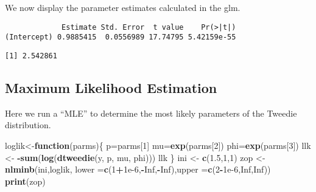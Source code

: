\documentclass[]{book}
\newenvironment{Shaded}{\begin{snugshade}}{\end{snugshade}}
\newcommand{\KeywordTok}[1]{\textcolor[rgb]{0.13,0.29,0.53}{\textbf{#1}}}
\newcommand{\DataTypeTok}[1]{\textcolor[rgb]{0.13,0.29,0.53}{#1}}
\newcommand{\DecValTok}[1]{\textcolor[rgb]{0.00,0.00,0.81}{#1}}
\newcommand{\FloatTok}[1]{\textcolor[rgb]{0.00,0.00,0.81}{#1}}
\newcommand{\StringTok}[1]{\textcolor[rgb]{0.31,0.60,0.02}{#1}}
\newcommand{\OtherTok}[1]{\textcolor[rgb]{0.56,0.35,0.01}{#1}}
\newcommand{\ControlFlowTok}[1]{\textcolor[rgb]{0.13,0.29,0.53}{\textbf{#1}}}
\newcommand{\OperatorTok}[1]{\textcolor[rgb]{0.81,0.36,0.00}{\textbf{#1}}}
\newcommand{\NormalTok}[1]{#1}
\theoremstyle{definition}
\theoremstyle{definition}
\theoremstyle{definition}
\theoremstyle{remark}
\begin{document}
We now display the parameter estimates calculated in the glm.

\begin{Shaded}
\end{Shaded}

\begin{verbatim}
             Estimate Std. Error  t value    Pr(>|t|)
(Intercept) 0.9885415  0.0556989 17.74795 5.42159e-55
\end{verbatim}

\begin{Shaded}
\end{Shaded}

\begin{verbatim}
[1] 2.542861
\end{verbatim}

\subsection{Maximum Likelihood
Estimation}\label{maximum-likelihood-estimation}

Here we run a ``MLE'' to determine the most likely parameters of the
Tweedie distribution.

\begin{Shaded}
\begin{Highlighting}[]
\NormalTok{loglik<-}\ControlFlowTok{function}\NormalTok{(parms)\{ }
\NormalTok{  p=parms[}\DecValTok{1}\NormalTok{]}
\NormalTok{  mu=}\KeywordTok{exp}\NormalTok{(parms[}\DecValTok{2}\NormalTok{])}
\NormalTok{  phi=}\KeywordTok{exp}\NormalTok{(parms[}\DecValTok{3}\NormalTok{])}
\NormalTok{  llk <-}\StringTok{ }\OperatorTok{-}\KeywordTok{sum}\NormalTok{(}\KeywordTok{log}\NormalTok{(}\KeywordTok{dtweedie}\NormalTok{(y, p, mu, phi)))}
\NormalTok{  llk}
\NormalTok{\}}
\NormalTok{ini <-}\StringTok{ }\KeywordTok{c}\NormalTok{(}\FloatTok{1.5}\NormalTok{,}\DecValTok{1}\NormalTok{,}\DecValTok{1}\NormalTok{)}
\NormalTok{zop <-}\StringTok{ }\KeywordTok{nlminb}\NormalTok{(ini,loglik, }\DataTypeTok{lower =}\KeywordTok{c}\NormalTok{(}\DecValTok{1}\OperatorTok{+}\FloatTok{1e-6}\NormalTok{,}\OperatorTok{-}\OtherTok{Inf}\NormalTok{,}\OperatorTok{-}\OtherTok{Inf}\NormalTok{),}\DataTypeTok{upper =}\KeywordTok{c}\NormalTok{(}\DecValTok{2}\OperatorTok{-}\FloatTok{1e-6}\NormalTok{,}\OtherTok{Inf}\NormalTok{,}\OtherTok{Inf}\NormalTok{))}
\KeywordTok{print}\NormalTok{(zop)}
\end{Highlighting}
\end{Shaded}
\end{document}
